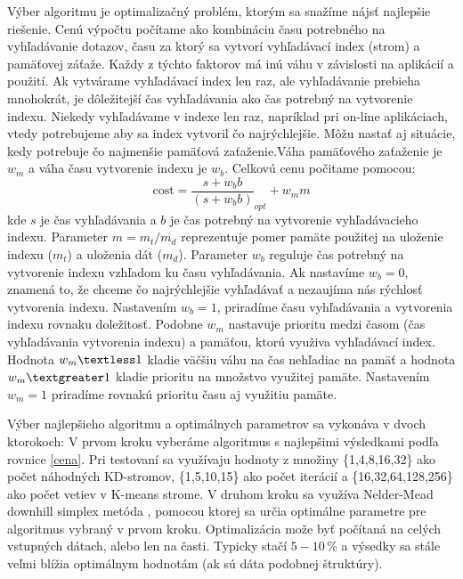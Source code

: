 \documentclass[12pt,oneside]{fithesis2}
\begin{document}
	Výber algoritmu je optimalizačný problém, ktorým sa snažíme nájsť najlepšie riešenie. Cenú výpočtu počítame ako kombináciu času potrebného na vyhľadávanie dotazov, času za ktorý sa vytvorí vyhľadávací index (strom) a pamäťovej záťaže. Každy z týchto faktorov má inú váhu v závislosti na aplikácií a použití. Ak vytvárame vyhľadávací index len raz, ale vyhľadávanie prebieha mnohokrát, je dôležitejší čas vyhľadávania ako čas potrebný na vytvorenie indexu. Niekedy vyhľadávame v indexe len raz, napríklad pri on-line aplikáciach, vtedy potrebujeme aby sa index vytvoril čo najrýchlejšie. Môžu nastať aj situácie, kedy potrebuje čo najmenšie pamäťová zaťaženie.Váha pamäťového zaťaženie je $w_m$ a váha času vytvorenie indexu je $w_b$. Celkovú cenu počitame pomocou:
	\begin{equation}
	\mathrm{cost} = \dfrac{s + w_bb}{(s + w_bb)}_{opt} + w_mm
	\label{cena}
	\end{equation}
kde $s$ je čas vyhľadávania a $b$ je čas potrebný na vytvorenie vyhľadávacieho indexu. Parameter $m = m_t/m_d$ reprezentuje pomer pamäte použitej na uloženie indexu ($m_t$) a uloženia dát ($m_d$). Parameter $w_b$ reguluje čas potrebný na vytvorenie indexu vzhľadom ku času vyhľadávania. Ak nastavíme $w_b = 0$, znamená to, že chceme čo najrýchlejšie vyhľadávať a nezaujíma nás rýchlosť vytvorenia indexu. Nastavením $w_b = 1$, priradíme času vyhľadávania a vytvorenia indexu rovnaku doležitosť. Podobne $w_m$ nastavuje prioritu medzi časom (čas vyhľadávania vytvorenia indexu) a pamäťou, ktorú využiva vyhľadávací index. Hodnota $w_m \textless 1$ kladie väčšiu váhu na čas nehľadiac na pamäť a hodnota $w_m \textgreater 1$  kladie prioritu na množstvo využitej pamäte. Nastavením $w_m = 1$ priradíme rovnakú prioritu času aj využitiu pamäte. \cite{muja_flann_2009} 

Výber najlepšieho algoritmu a optimálnych parametrov sa vykonáva v dvoch ktorokoch: V prvom kroku vyberáme algoritmus s najlepšimi výsledkami podľa rovnice \ref{cena}. Pri testovaní sa využívaju hodnoty z množiny \{1,4,8,16,32\} ako počet náhodných KD-stromov, \{1,5,10,15\} ako počet iterácií a \{16,32,64,128,256\} ako počet vetiev v K-means strome. V druhom kroku sa využíva Nelder-Mead downhill simplex metóda \cite{NelderMead65}, pomocou ktorej sa určia optimálne parametre pre algoritmus vybraný v prvom kroku. Optimalizácia može byť počítaná na celých vstupných dátach, alebo len na časti. Typicky stačí $5-10\,\%$ a výsedky sa stále veľmi blížia optimálnym hodnotám (ak sú dáta podobnej štruktúry). \cite{muja_flann_2009} 
\end{document}
